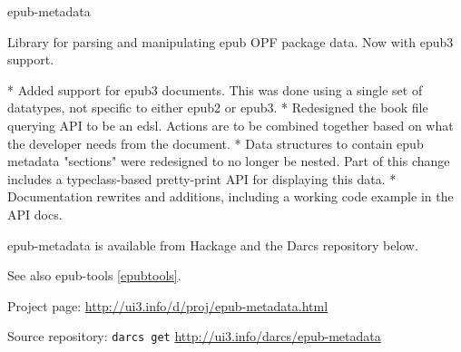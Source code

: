 \begin{hcarentry}{epub-metadata}
\makeheader

Library for parsing and manipulating epub OPF package data. Now with epub3 support.

* Added support for epub3 documents. This was done using a single set of datatypes, not specific to either epub2 or epub3.
* Redesigned the book file querying API to be an edsl. Actions are to be combined together based on what the developer needs from the document.
* Data structures to contain epub metadata "sections" were redesigned to no longer be nested. Part of this change includes a typeclass-based pretty-print API for displaying this data.
* Documentation rewrites and additions, including a working code example in the API docs.

epub-metadata is available from Hackage and the Darcs repository below.

See also epub-tools \cref{epubtools}.

\FurtherReading
\begin{compactitem}
\item Project page:
\url{http://ui3.info/d/proj/epub-metadata.html}

\item Source repository:
\texttt{darcs get} \url{http://ui3.info/darcs/epub-metadata}
\end{compactitem}
\end{hcarentry}
